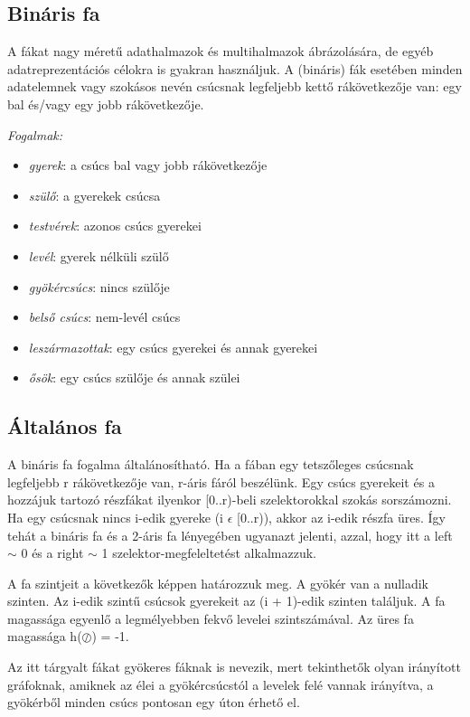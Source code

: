 \documentclass[margin=0px]{article}
\begin{document}
\subsection{Bináris fa}

A fákat nagy méretű adathalmazok és multihalmazok ábrázolására,
de egyéb adatreprezentációs célokra is gyakran használjuk.
A (bináris) fák esetében minden adatelemnek vagy szokásos nevén csúcsnak 
legfeljebb kettő rákövetkezője van: egy bal és/vagy egy
jobb rákövetkezője.

\textit{Fogalmak:}
\begin{itemize}
    \item \textit{gyerek}: a csúcs bal vagy jobb rákövetkezője
    \item \textit{szülő}: a gyerekek csúcsa
    \item \textit{testvérek}: azonos csúcs gyerekei
    \item \textit{levél}: gyerek nélküli szülő
    \item \textit{gyökércsúcs}: nincs szülője
    \item \textit{belső csúcs}: nem-levél csúcs
    \item \textit{leszármazottak}: egy csúcs gyerekei és annak gyerekei
    \item \textit{ősök}: egy csúcs szülője és annak szülei
\end{itemize}

\subsection{Általános fa}
A bináris fa fogalma általánosítható. Ha a fában egy tetszőleges csúcsnak legfeljebb r rákövetkezője van, r-áris fáról beszélünk. Egy csúcs gyerekeit és a hozzájuk tartozó részfákat ilyenkor [0..r)-beli szelektorokkal szokás sorszámozni. Ha egy csúcsnak nincs i-edik gyereke (i $\epsilon$  [0..r)), akkor az i-edik
részfa üres. Így tehát a bináris fa és a 2-áris fa lényegében ugyanazt jelenti, azzal,
hogy itt a left $\sim$  0 és a right $\sim$ 1 szelektor-megfeleltetést alkalmazzuk.

A fa szintjeit a következők képpen határozzuk meg. A gyökér van a nulladik szinten. Az
i-edik szintű csúcsok gyerekeit az (i + 1)-edik szinten találjuk. A fa magassága egyenlő a legmélyebben fekvő levelei szintszámával. Az üres fa magassága h($\oslash$) = -1.

Az itt tárgyalt fákat gyökeres fáknak is nevezik, mert tekinthetők olyan irányított gráfoknak, amiknek az élei a gyökércsúcstól a levelek felé vannak
irányítva, a gyökérből minden csúcs pontosan egy úton érhető el.
\end{document}
